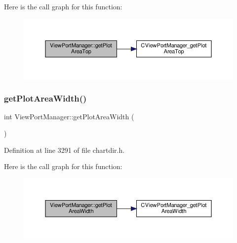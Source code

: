 Here is the call graph for this function\+:
\nopagebreak
\begin{figure}[H]
\begin{center}
\leavevmode
\includegraphics[width=350pt]{class_view_port_manager_a4f4797760398802b6cc12970f57e3039_cgraph}
\end{center}
\end{figure}
\mbox{\label{class_view_port_manager_a343ea77ab814cfbb1e47322d11eebf9e}} 
\subsubsection{\texorpdfstring{get\+Plot\+Area\+Width()}{getPlotAreaWidth()}}
{\footnotesize\ttfamily int View\+Port\+Manager\+::get\+Plot\+Area\+Width (\begin{DoxyParamCaption}{ }\end{DoxyParamCaption})\hspace{0.3cm}{\ttfamily [inline]}}



Definition at line 3291 of file chartdir.\+h.

Here is the call graph for this function\+:
\nopagebreak
\begin{figure}[H]
\begin{center}
\leavevmode
\includegraphics[width=350pt]{class_view_port_manager_a343ea77ab814cfbb1e47322d11eebf9e_cgraph}
\end{center}
\end{figure}
\mbox{\label{class_view_port_manager_a9109a8e0fa981a9443205641d59bb409}} 
